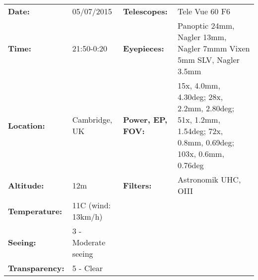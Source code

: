 \begin{tabular}{ p{0.9in} p{1.3in} p{1.2in} p{5.2in}}
{\bf Date:} & 05/07/2015 & {\bf Telescopes:} & Tele Vue 60 F6 \\ 
{\bf Time:} & 21:50-0:20 & {\bf Eyepieces:} & Panoptic 24mm, Nagler 13mm, Nagler 7mmm Vixen 5mm SLV, Nagler 3.5mm \\ 
{\bf Location:} & Cambridge, UK & {\bf Power, EP, FOV:} & 15x, 4.0mm, 4.30deg; 28x, 2.2mm, 2.80deg; 51x, 1.2mm, 1.54deg; 72x, 0.8mm, 0.69deg; 103x, 0.6mm, 0.76deg \\ 
{\bf Altitude:} & 12m & {\bf Filters:} & Astronomik UHC, OIII \\ 
{\bf Temperature:} & 11C (wind: 13km/h) & & \\ 
{\bf Seeing:} & 3 - Moderate seeing & & \\ 
{\bf Transparency:} & 5 - Clear & & \\ 
\end{tabular}
